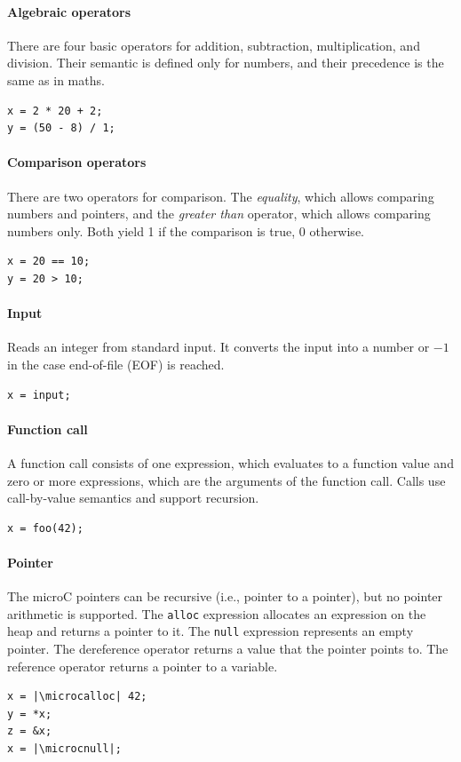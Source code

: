 \documentclass[thesis=M,english]{FITthesis}[2019/12/23]
\newcommand{\microcalloc}{\textcolor{codeblue}{alloc}}
\newcommand{\microcnull}{\textcolor{codeblue}{null}}
\begin{document}
\paragraph*{Algebraic operators} There are four basic operators for addition, subtraction, multiplication, and division. Their semantic is defined only for numbers, and their precedence is the same as in maths.
\begin{verbatim}
x = 2 * 20 + 2;
y = (50 - 8) / 1;
\end{verbatim}

\paragraph*{Comparison operators} There are two operators for comparison. The \emph{equality}, which allows comparing numbers and pointers, and the \emph{greater than} operator, which allows comparing numbers only. Both yield 1 if the comparison is true, 0 otherwise.
\begin{verbatim}
x = 20 == 10;
y = 20 > 10;
\end{verbatim}

\paragraph*{Input} Reads an integer from standard input. It converts the input into a number or $-1$ in the case end-of-file (EOF) is reached.
\begin{verbatim}
x = input;
\end{verbatim}

\paragraph*{Function call} A function call consists of one expression, which evaluates to a function value and zero or more expressions, which are the arguments of the function call. Calls use call-by-value semantics and support recursion.
\begin{verbatim}
x = foo(42);
\end{verbatim}

\paragraph*{Pointer} The microC pointers can be recursive (i.e., pointer to a pointer), but no pointer arithmetic is supported. The \texttt{alloc} expression allocates an expression on the heap and returns a pointer to it. The \texttt{null} expression represents an empty pointer. The dereference operator returns a value that the pointer points to. The reference operator returns a pointer to a variable.
\begin{verbatim}
x = |\microcalloc| 42;
y = *x;
z = &x;
x = |\microcnull|;
\end{verbatim}
\end{document}
